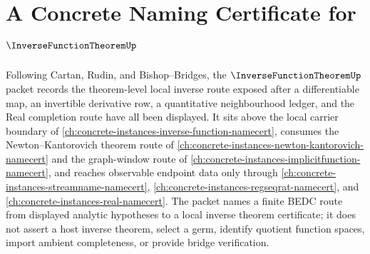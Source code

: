 \chapter{A Concrete Naming Certificate for $\InverseFunctionTheoremUp$}
\label{ch:concrete-instances-inverse-function-theorem-namecert}

Following Cartan, Rudin, and Bishop--Bridges, the $\InverseFunctionTheoremUp$ packet records the theorem-level local inverse route exposed after a differentiable map, an invertible derivative row, a quantitative neighbourhood ledger, and the Real completion route have all been displayed. It sits above the local carrier boundary of \autoref{ch:concrete-instances-inverse-function-namecert}, consumes the Newton--Kantorovich theorem route of \autoref{ch:concrete-instances-newton-kantorovich-namecert} and the graph-window route of \autoref{ch:concrete-instances-implicitfunction-namecert}, and reaches observable endpoint data only through \autoref{ch:concrete-instances-streamname-namecert}, \autoref{ch:concrete-instances-regseqrat-namecert}, and \autoref{ch:concrete-instances-real-namecert}. The packet names a finite BEDC route from displayed analytic hypotheses to a local inverse theorem certificate; it does not assert a host inverse theorem, select a germ, identify quotient function spaces, import ambient completeness, or provide bridge verification.

